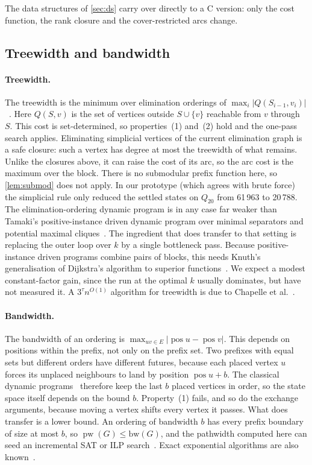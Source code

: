 \documentclass[11pt]{article}
\theoremstyle{definition}
\newcommand{\pw}{\operatorname{pw}}
\newcommand{\set}[1]{\{#1\}}
\begin{document}
The data structures of \cref{sec:ds} carry over directly to a C version:
only the cost function, the rank closure and the cover-restricted arcs
change.

\subsection{Treewidth and bandwidth}\label{sec:twbw}

\paragraph{Treewidth.} The treewidth is the minimum over elimination
orderings of $\max_i|Q(S_{i-1},v_i)|$~\cite{BFKKT12}. Here $Q(S,v)$ is the
set of vertices outside $S\cup\set v$ reachable from $v$ through~$S$. This
cost is set-determined, so properties~(1) and~(2) hold and the one-pass
search applies. Eliminating simplicial vertices of the current elimination
graph is a safe closure: such a vertex has degree at most the treewidth of
what remains. Unlike the closures above, it can raise the cost of its arc,
so the arc cost is the maximum over the block. There is no submodular prefix
function here, so \cref{lem:submod} does not apply. In our prototype (which
agrees with brute force) the simplicial rule only reduced the settled states
on $Q_{20}$ from 61\,963 to 20\,788. The elimination-ordering dynamic
program is in any case far weaker than Tamaki's positive-instance driven
dynamic program over minimal separators and potential maximal
cliques~\cite{Tam19}. The ingredient that does transfer to that setting is
replacing the outer loop over $k$ by a single bottleneck pass. Because
positive-instance driven programs combine pairs of blocks, this needs
Knuth's generalisation of Dijkstra's algorithm to superior
functions~\cite{Knu77}. We expect a modest constant-factor gain, since the
run at the optimal $k$ usually dominates, but have not measured it. A
$3^{\tau}n^{O(1)}$ algorithm for treewidth is due to Chapelle et
al.~\cite{CLTV13}.

\paragraph{Bandwidth.} The bandwidth of an ordering is $\max_{uv\in
E}|\operatorname{pos}u-\operatorname{pos}v|$. This depends on positions
within the prefix, not only on the prefix set. Two prefixes with equal sets
but different orders have different futures, because each placed vertex $u$
forces its unplaced neighbours to land by position
$\operatorname{pos}u+b$. The classical dynamic programs~\cite{Sax80,GS84}
therefore keep the last $b$ placed vertices in order, so the state space
itself depends on the bound $b$. Property~(1) fails, and so do the exchange
arguments, because moving a vertex shifts every vertex it passes. What does
transfer is a lower bound. An ordering of bandwidth $b$ has every prefix
boundary of size at most $b$, so $\pw(G)\le\mathrm{bw}(G)$, and the
pathwidth computed here can seed an incremental SAT or ILP
search~\cite{BBNNPR13}. Exact exponential algorithms are also
known~\cite{CP12}.
\end{document}

